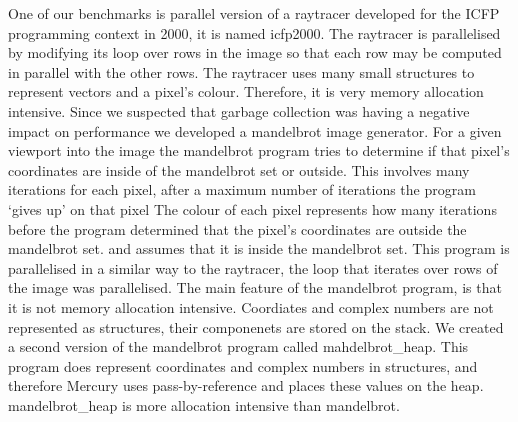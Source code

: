 One of our benchmarks is parallel version of a raytracer developed for the
ICFP programming context in 2000,
it is named icfp2000.
The raytracer is parallelised by modifying its loop over rows in the image
so that each row may be computed in parallel with the other rows.
The raytracer uses many small structures to represent vectors and a pixel's
colour.
Therefore,
it is very memory allocation intensive.
Since we suspected that garbage collection was having a negative impact on
performance we developed a mandelbrot image generator.
For a given viewport into the image the mandelbrot program 
tries to determine if that pixel's coordinates are inside of the mandelbrot
set or outside.
This involves many iterations for each pixel,
after a maximum number of iterations the program `gives up' on that pixel
The colour of each pixel represents how many iterations before the program
determined that the pixel's coordinates are outside the mandelbrot set.
and assumes that it is inside the mandelbrot set.
This program is parallelised in a similar way to the raytracer,
the loop that iterates over rows of the image was parallelised.
The main feature of the mandelbrot program,
is that it is not memory allocation intensive.
Coordiates and complex numbers are not represented as structures,
their componenets are stored on the stack.
We created a second version of the mandelbrot program called
mahdelbrot\_heap.
This program does represent coordinates and complex numbers in structures,
and therefore Mercury uses pass-by-reference and places these values on the
heap.
mandelbrot\_heap is more allocation intensive than mandelbrot.

